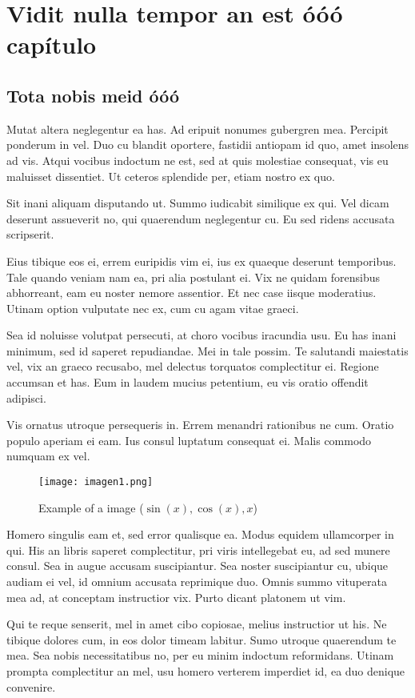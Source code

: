 \chapter{Vidit nulla tempor an est óóó capítulo}
\section{Tota nobis meid óóó}
Mutat altera neglegentur ea has. Ad eripuit nonumes gubergren mea. Percipit ponderum in vel. Duo cu blandit oportere, fastidii antiopam id quo, amet insolens ad vis. Atqui vocibus indoctum ne est, sed at quis molestiae consequat, vis eu maluisset dissentiet. Ut ceteros splendide per, etiam nostro ex quo.
\cite{einstein}

Sit inani aliquam disputando ut. Summo iudicabit similique ex qui. Vel dicam deserunt assueverit no, qui quaerendum neglegentur cu. Eu sed ridens accusata scripserit.

Eius tibique eos ei, errem euripidis vim ei, ius ex quaeque deserunt temporibus. Tale quando veniam nam ea, pri alia postulant ei. Vix ne quidam forensibus abhorreant, eam eu noster nemore assentior. Et nec case iisque moderatius. Utinam option vulputate nec ex, cum cu agam vitae graeci.

Sea id noluisse volutpat persecuti, at choro vocibus iracundia usu. Eu has inani minimum, sed id saperet repudiandae. Mei in tale possim. Te salutandi maiestatis vel, vix an graeco recusabo, mel delectus torquatos complectitur ei. Regione accumsan et has. Eum in laudem mucius petentium, eu vis oratio offendit adipisci.

Vis ornatus utroque persequeris in. Errem menandri rationibus ne cum. Oratio populo aperiam ei eam. Ius consul luptatum consequat ei. Malis commodo numquam ex vel.


\begin{figure}[h]
\caption{Example of a image ($\sin (x), \cos(x), x$)}
\centering
\texttt{[image: imagen1.png]}
\end{figure}

Homero singulis eam et, sed error qualisque ea. Modus equidem ullamcorper in qui. His an libris saperet complectitur, pri viris intellegebat eu, ad sed munere consul. Sea in augue accusam suscipiantur. Sea noster suscipiantur cu, ubique audiam ei vel, id omnium accusata reprimique duo. Omnis summo vituperata mea ad, at conceptam instructior vix. Purto dicant platonem ut vim.

Qui te reque senserit, mel in amet cibo copiosae, melius instructior ut his. Ne tibique dolores cum, in eos dolor timeam labitur. Sumo utroque quaerendum te mea. Sea nobis necessitatibus no, per eu minim indoctum reformidans. Utinam prompta complectitur an mel, usu homero verterem imperdiet id, ea duo denique convenire.

